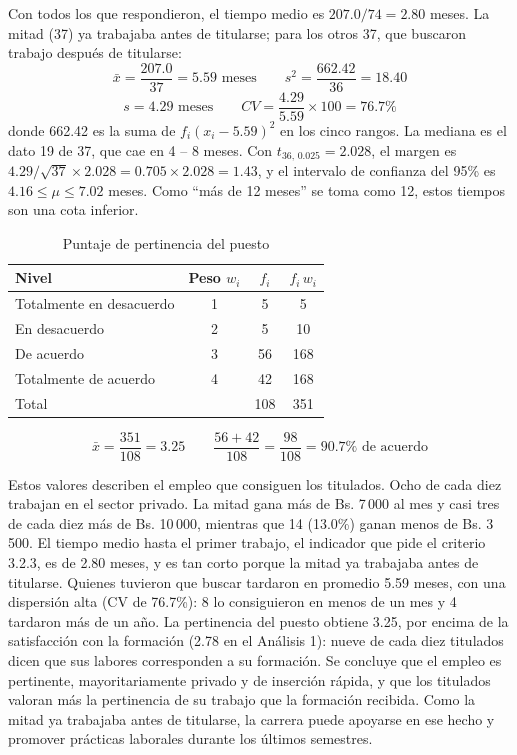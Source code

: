 \documentclass[12pt, a4paper]{article}
\newenvironment{mitabla}[2][H]{%
  \begin{table}[#1]
  \centering
  \caption{#2}
  \small
}{%
  \end{table}
}
\begin{document}
Con todos los que respondieron, el tiempo medio es $207.0/74 = 2.80$
meses. La mitad (37) ya trabajaba antes de titularse; para los otros 37,
que buscaron trabajo después de titularse:
\[
\bar{x} = \frac{207.0}{37} = 5.59 \text{ meses} \qquad
s^2 = \frac{662.42}{36} = 18.40
\]
\[
s = 4.29 \text{ meses} \qquad
CV = \frac{4.29}{5.59} \times 100 = 76.7\%
\]
donde 662.42 es la suma de $f_i (x_i - 5.59)^2$ en los cinco rangos. La
mediana es el dato 19 de 37, que cae en 4 -- 8 meses. Con $t_{36,\,0.025}
= 2.028$, el margen es $4.29/\sqrt{37} \times 2.028 = 0.705 \times 2.028 =
1.43$, y el intervalo de confianza del 95\% es $4.16 \le \mu \le 7.02$
meses. Como ``más de 12 meses'' se toma como 12, estos tiempos son una
cota inferior.

\begin{mitabla}{Puntaje de pertinencia del puesto}\label{tab:a3-pond}
\begin{tabular}{lccc}
\toprule
\textbf{Nivel} & \textbf{Peso $w_i$} & \textbf{$f_i$} & \textbf{$f_i \, w_i$} \\
\midrule
Totalmente en desacuerdo & 1 & 5 & 5 \\
En desacuerdo & 2 & 5 & 10 \\
De acuerdo & 3 & 56 & 168 \\
Totalmente de acuerdo & 4 & 42 & 168 \\
\midrule
Total & & 108 & 351 \\
\bottomrule
\end{tabular}
\end{mitabla}

\[
\bar{x} = \frac{351}{108} = 3.25 \qquad \frac{56 + 42}{108} = \frac{98}{108} = 90.7\% \text{ de acuerdo}
\]

Estos valores describen el empleo que consiguen los titulados. Ocho de
cada diez trabajan en el sector privado. La mitad gana más de Bs. 7\,000
al mes y casi tres de cada diez más de Bs. 10\,000, mientras que 14
(13.0\%) ganan menos de Bs. 3\,500. El tiempo medio hasta el primer
trabajo, el indicador que pide el criterio 3.2.3, es de 2.80 meses, y es
tan corto porque la mitad ya trabajaba antes de titularse. Quienes
tuvieron que buscar tardaron en promedio 5.59 meses, con una dispersión
alta (CV de 76.7\%): 8 lo consiguieron en menos de un mes y 4 tardaron
más de un año. La pertinencia del puesto obtiene 3.25, por encima de la
satisfacción con la formación (2.78 en el Análisis 1): nueve de cada diez
titulados dicen que sus labores corresponden a su formación. Se concluye
que el empleo es pertinente, mayoritariamente privado y de inserción
rápida, y que los titulados valoran más la pertinencia de su trabajo que
la formación recibida. Como la mitad ya trabajaba antes de titularse, la
carrera puede apoyarse en ese hecho y promover prácticas laborales
durante los últimos semestres.
\end{document}
